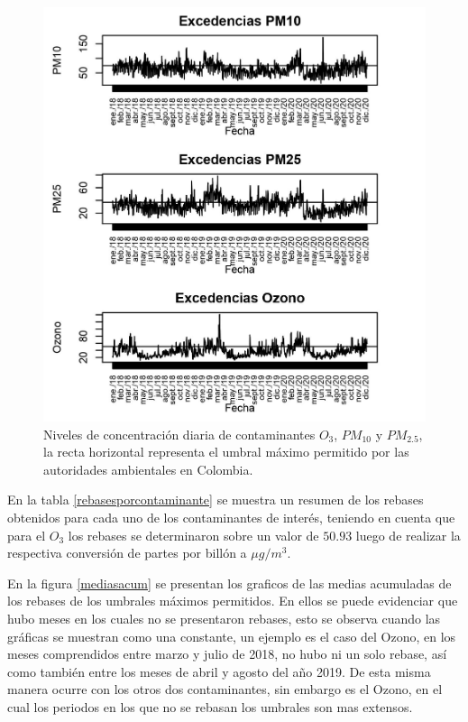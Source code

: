 \begin{figure}[!h]
\begin{center}
\includegraphics[scale=1.5]{seriesdetiempo}
\end{center}
\centering
\caption{Niveles de concentración diaria de contaminantes $O_3$, $PM_{10}$ y $PM_{2.5}$, la recta horizontal representa el umbral máximo permitido por las autoridades ambientales en Colombia.}
\label{seriesdet}
\end{figure}

En la tabla \ref{rebasesporcontaminante} se muestra un resumen de los rebases obtenidos para cada uno de los contaminantes de interés, teniendo en cuenta que para el $O_3$ los rebases se determinaron sobre un valor de $50.93$ luego de realizar la respectiva conversión de partes por billón a $\mu g/m^3$. 

En la figura \ref{mediasacum} se presentan los graficos de las medias acumuladas de los rebases de los umbrales máximos permitidos. En ellos se puede evidenciar que hubo meses en los cuales no se presentaron rebases, esto se observa cuando las gráficas se muestran como una constante, un ejemplo es el caso del Ozono, en los meses comprendidos entre marzo y julio de 2018, no hubo ni un solo rebase, así como también entre los meses de abril y agosto del año 2019. De esta misma manera ocurre con los otros dos contaminantes, sin embargo es el Ozono, en el cual los periodos en los que no se rebasan los umbrales son mas extensos. 



